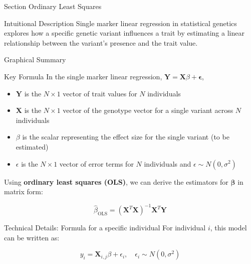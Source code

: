 
\begin{frame}{Section}
\centering
\Huge{Ordinary Least Squares}
\end{frame}


\begin{frame}{Intuitional Description}
Single marker linear regression in statistical genetics explores how a specific genetic variant influences a trait by estimating a linear relationship between the variant's presence and the trait value.
\end{frame}

\begin{frame}{Graphical Summary}

\end{frame}


\begin{frame}{Key Formula}
In the single marker linear regression, $\mathbf{Y} = \mathbf{X} \beta  + \boldsymbol{\epsilon}$,
\begin{itemize}
\item $\mathbf{Y}$ is the $N \times 1$ vector of trait values for $N$ individuals
\item $\mathbf{X}$ is the $N \times 1$ vector of the genotype vector for a single variant across $N$ individuals
\item $\beta$ is the scalar representing the effect size for the single variant (to be estimated)
\item $\epsilon$ is the $N \times 1$ vector of error terms for $N$ individuals and $\epsilon \sim N(0, \sigma^2)$
\end{itemize}

Using \textbf{ordinary least squares (OLS)}, we can derive the estimators for $\boldsymbol{\beta}$ in matrix form:

$$
\hat{\beta}_{\text{OLS}} = (\mathbf{X}^T\mathbf{X})^{-1}\mathbf{X}^T\mathbf{Y}
$$

\end{frame}


\begin{frame}{Technical Details: Formula for a specific individual}
For individual $i$, this model can be written as:

$$
y_i =  \mathbf{X}_{i,j} \beta + \epsilon_i, \quad \epsilon_i \sim N(0, \sigma^2)
$$
\end{frame}

